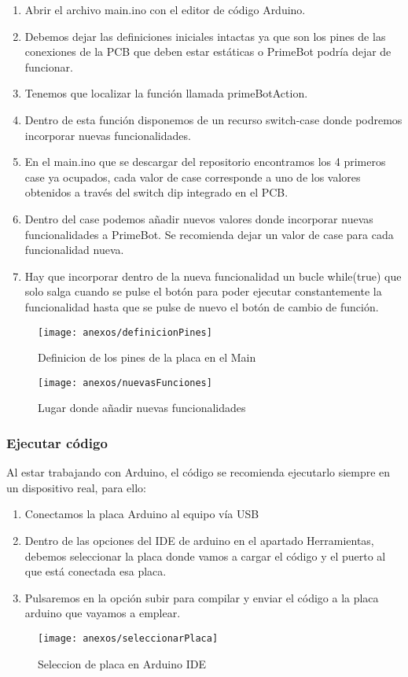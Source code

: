 \begin{enumerate}
\def\labelenumi{\arabic{enumi}.}
\tightlist

\item
Abrir el archivo main.ino con el editor de código Arduino.
\item
Debemos dejar las definiciones iniciales intactas ya que son los pines de las conexiones de la PCB que deben estar estáticas o PrimeBot podría dejar de funcionar.
\item
Tenemos que localizar la función llamada primeBotAction.
\item
Dentro de esta función disponemos de un recurso switch-case donde podremos incorporar nuevas funcionalidades.
\item
En el main.ino que se descargar del repositorio encontramos los 4 primeros case ya ocupados, cada valor de case corresponde a uno de los valores obtenidos a través del switch dip integrado en el PCB.
\item
Dentro del case podemos añadir nuevos valores donde incorporar nuevas funcionalidades a PrimeBot.
Se recomienda dejar un valor de case para cada funcionalidad nueva.
\item
Hay que incorporar dentro de la nueva funcionalidad un bucle while(true) que solo salga cuando se pulse el botón para poder ejecutar constantemente la funcionalidad hasta que se pulse de nuevo el botón de cambio de función.
\end{enumerate}

\begin{figure}[h]
	\centering
	\texttt{[image: anexos/definicionPines]}
	\caption{Definicion de los pines de la placa en el Main}
	\label{fig:D.5}
\end{figure}

\begin{figure}[H]
	\centering
	\texttt{[image: anexos/nuevasFunciones]}
	\caption{Lugar donde añadir nuevas funcionalidades}
	\label{fig:D.6}
\end{figure}


\subsubsection{Ejecutar código}\label{ejecutar-codigo}
Al estar trabajando con Arduino, el código se recomienda ejecutarlo siempre en un dispositivo real, para ello:
\begin{enumerate}
\def\labelenumi{\arabic{enumi}.}
\tightlist
\item
Conectamos la placa Arduino al equipo vía USB
\item
Dentro de las opciones del IDE de arduino en el apartado Herramientas, debemos seleccionar la placa donde vamos a cargar el código y el puerto al que está conectada esa placa.
\item
Pulsaremos en la opción subir para compilar y enviar el código a la placa arduino que vayamos a emplear.
\end{enumerate}
\begin{figure}[h]
	\centering
	\texttt{[image: anexos/seleccionarPlaca]}
	\caption{Seleccion de placa en Arduino IDE}
	\label{fig:D.7}
\end{figure}
